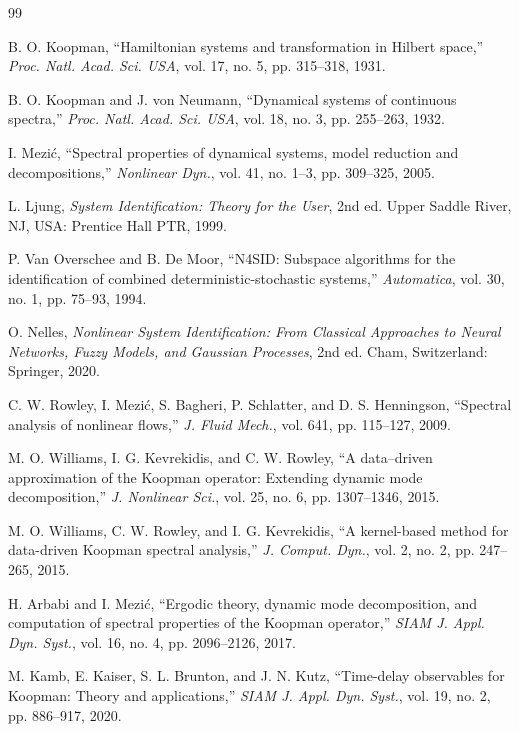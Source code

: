 \documentclass[journal]{IEEEtran}
\begin{document}
\begin{thebibliography}{99}

B. O. Koopman, ``Hamiltonian systems and transformation in Hilbert space,'' \emph{Proc. Natl. Acad. Sci. USA}, vol. 17, no. 5, pp. 315--318, 1931.

B. O. Koopman and J. von Neumann, ``Dynamical systems of continuous spectra,'' \emph{Proc. Natl. Acad. Sci. USA}, vol. 18, no. 3, pp. 255--263, 1932.

I. Mezi\'c, ``Spectral properties of dynamical systems, model reduction and decompositions,'' \emph{Nonlinear Dyn.}, vol. 41, no. 1--3, pp. 309--325, 2005.

L. Ljung, \emph{System Identification: Theory for the User}, 2nd ed. Upper Saddle River, NJ, USA: Prentice Hall PTR, 1999.

P. Van Overschee and B. De Moor, ``N4SID: Subspace algorithms for the identification of combined deterministic-stochastic systems,'' \emph{Automatica}, vol. 30, no. 1, pp. 75--93, 1994.

O. Nelles, \emph{Nonlinear System Identification: From Classical Approaches to Neural Networks, Fuzzy Models, and Gaussian Processes}, 2nd ed. Cham, Switzerland: Springer, 2020.

C. W. Rowley, I. Mezi\'c, S. Bagheri, P. Schlatter, and D. S. Henningson, ``Spectral analysis of nonlinear flows,'' \emph{J. Fluid Mech.}, vol. 641, pp. 115--127, 2009.

M. O. Williams, I. G. Kevrekidis, and C. W. Rowley, ``A data--driven approximation of the Koopman operator: Extending dynamic mode decomposition,'' \emph{J. Nonlinear Sci.}, vol. 25, no. 6, pp. 1307--1346, 2015.

M. O. Williams, C. W. Rowley, and I. G. Kevrekidis, ``A kernel-based method for data-driven Koopman spectral analysis,'' \emph{J. Comput. Dyn.}, vol. 2, no. 2, pp. 247--265, 2015.

H. Arbabi and I. Mezi\'c, ``Ergodic theory, dynamic mode decomposition, and computation of spectral properties of the Koopman operator,'' \emph{SIAM J. Appl. Dyn. Syst.}, vol. 16, no. 4, pp. 2096--2126, 2017.

M. Kamb, E. Kaiser, S. L. Brunton, and J. N. Kutz, ``Time-delay observables for Koopman: Theory and applications,'' \emph{SIAM J. Appl. Dyn. Syst.}, vol. 19, no. 2, pp. 886--917, 2020.


\end{thebibliography}
\end{document}
